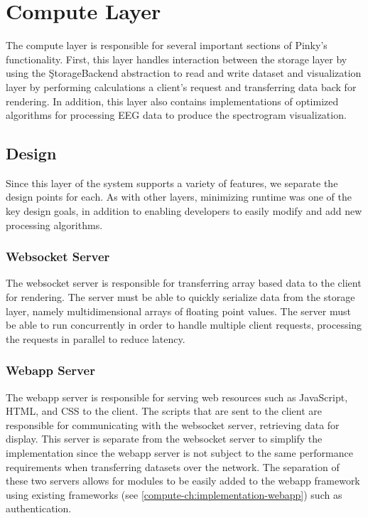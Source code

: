 \chapter{Compute Layer}\label{compute-ch}

The compute layer is responsible for several important sections of Pinky's
functionality. First, this layer handles interaction between the storage layer
by using the \c{StorageBackend} abstraction to read and write dataset and
visualization layer by performing calculations a client's request and
transferring data back for rendering. In addition, this layer also contains
implementations of optimized algorithms for processing EEG data to produce the
spectrogram visualization.

\section{Design}

Since this layer of the system supports a variety of features, we separate the
design points for each. As with other layers, minimizing runtime was one of the
key design goals, in addition to enabling developers to easily modify and add
new processing algorithms.

\subsection{Websocket Server}

The websocket server is responsible for transferring array based data to the
client for rendering. The server must be able to quickly serialize data from
the storage layer, namely multidimensional arrays of floating point values. The
server must be able to run concurrently in order to handle multiple client
requests, processing the requests in parallel to reduce latency.

\subsection{Webapp Server}

The webapp server is responsible for serving web resources such as JavaScript,
HTML, and CSS to the client. The scripts that are sent to the client are
responsible for communicating with the websocket server, retrieving data for
display. This server is separate from the websocket server to simplify the
implementation since the webapp server is not subject to the same performance
requirements when transferring datasets over the network. The separation of
these two servers allows for modules to be easily added to the webapp framework
using existing frameworks (see \ref{compute-ch:implementation-webapp}) such as
authentication.

